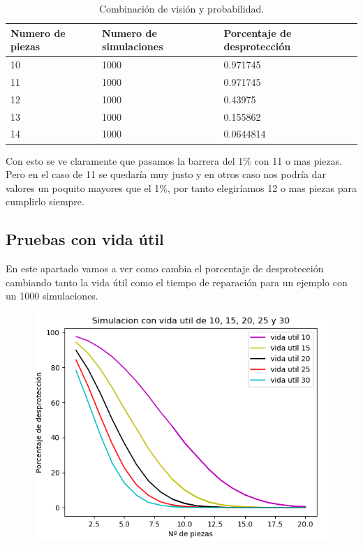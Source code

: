 \documentclass[]{article}
\begin{document}
 \begin{table}[H]
	\begin{center}
		\resizebox{12.5cm}{!} {
			\begin{tabular}{|l|l|l|}
				\hline
				Numero de piezas & Numero de simulaciones & Porcentaje de desprotección \\
				\hline \hline
				10 & 1000 & 0.971745
				\\ \hline
				11 & 1000 & 0.971745
				\\ \hline
				12 & 1000 & 0.43975
				\\ \hline
				13 & 1000 & 0.155862
				\\ \hline
				14 & 1000 & 0.0644814
				\\ \hline
			\end{tabular}
		}
		\caption{Combinación de visión y probabilidad.}
		\label{tabla:sencilla}
	\end{center}
\end{table}

Con esto se ve claramente que pasamos la barrera del 1\% con 11 o mas piezas. Pero en el caso de 11 se quedaría muy justo y en otros caso nos podría dar valores un poquito mayores que el 1\%, por tanto elegiríamos 12 o mas piezas para cumplirlo siempre. 

\subsection{Pruebas con vida útil}
En este apartado vamos a ver como cambia el porcentaje de desprotección cambiando tanto la vida útil como el tiempo de reparación para un ejemplo con un 1000 simulaciones.

\begin{figure}[H]
	\centering
	\includegraphics[width=1\linewidth]{img/screenshot0018}
	\caption{}
	\label{fig:screenshot0018}
\end{figure}
\end{document}

